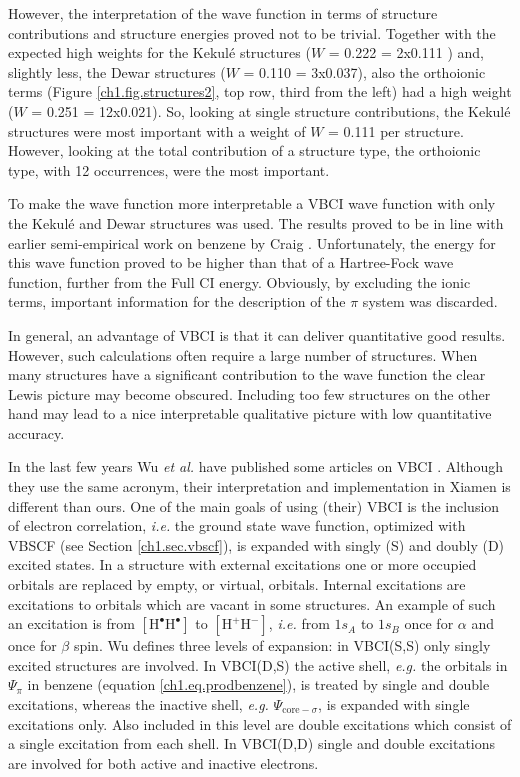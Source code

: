 However, the interpretation of the wave function in terms of structure contributions and structure energies proved not  to be trivial. Together with the expected high weights for the Kekul\'{e} structures ($W$ = 0.222 = 2x0.111 \cite{vbci175_2}) and, slightly less, the Dewar structures ($W$ = 0.110 = 3x0.037), also the orthoionic terms (Figure \ref{ch1.fig.structures2}, top row, third from the left) had a high weight ($W$ = 0.251 = 12x0.021). So, looking at single structure contributions, the Kekul\'e structures were most important with a weight of $W$ = 0.111 per structure. However, looking at the total contribution of a structure type, the orthoionic type, with 12 occurrences, were the most important.

To make the wave function more interpretable a VBCI wave function with only the Kekul\'{e} and Dewar structures was used. The results proved to be in line with earlier semi-empirical work on benzene by Craig \cite{craig}. Unfortunately, the energy for this wave function proved to be higher than that of a Hartree-Fock wave function, further from the Full CI energy. Obviously, by excluding the ionic terms, important information for the description of the $\pi$ system was discarded.

In general, an advantage of VBCI is that it can deliver quantitative good results. However, such calculations often require a large number of structures. When many structures have a significant contribution to the wave function the clear Lewis picture may become obscured. Including too few structures on the other hand may lead to a nice interpretable qualitative picture with low quantitative accuracy. 

In the last few years Wu \textit{et al.} have published some articles on VBCI \cite{vbci_wu1,vbci_wu2}. Although they use the same acronym, their interpretation and implementation in Xiamen \cite{xiamen} is different than ours. One of the main goals of using (their) VBCI is the inclusion of electron correlation, \textit{i.e.} the ground state wave function, optimized with VBSCF (see Section \ref{ch1.sec.vbscf}), is expanded with singly (S) and doubly (D) excited states. In a structure with external excitations one or more occupied orbitals are replaced by empty, or virtual, orbitals. Internal excitations are excitations to orbitals which are vacant in some structures. An example of such an excitation is from $\mathrm{[H^\bullet H^\bullet]}$ to $\mathrm{[H^{+} H^{-}]}$, \textit{i.e.} from $1s_A$ to $1s_B$ once for $\alpha$ and once for $\beta$ spin. Wu defines three levels of expansion: in VBCI(S,S) only singly excited structures are involved. In VBCI(D,S) the active shell, \textit{e.g.} the orbitals in $\Psi_{\pi}$ in benzene (equation \ref{ch1.eq.prodbenzene}), is treated by single and double excitations, whereas the inactive shell, \textit{e.g.} $\Psi_{\mathrm{core}-\sigma}$, is expanded with single excitations only. Also included in this level are double excitations which consist of a single excitation from each shell. In VBCI(D,D) single and double excitations are involved for both active and inactive electrons.


